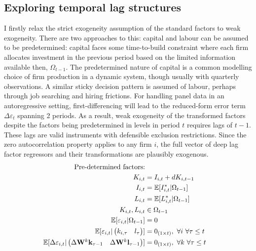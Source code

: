 \subsection{Exploring temporal lag structures}
\label{ss:dyn-ar}

I firstly relax the strict exogeneity assumption of the standard factors to weak exogeneity.
There are two approaches to this:
capital and labour can be assumed to be predetermined:
capital faces some time-to-build constraint
where each firm allocates investment in the previous period
based on the limited information available then, $\Omega_{t-1}$.
The predetermined nature of capital is a common modelling choice of
firm production in a dynamic system, though usually with quarterly observations.
A similar sticky decision pattern is assumed of labour,
perhaps through job searching and hiring frictions.
For handling panel data in an autoregressive setting,
first-differencing will lead to the reduced-form error term $\Delta\varepsilon_t$
spanning 2 periods.
As a result, weak exogeneity of the transformed factors
despite the factors being predetermined in levels in period $t$
requires lags of $t-1$.
These lags are valid instruments with defensible exclusion restrictions.
Since the zero autocorrelation property applies to any firm $i$,
the full vector of deep lag factor regressors and their transformations
are plausibly exogenous.
\begin{align}
    \notag
    \text{Pre-determined factors:}
    \\ \notag
    K_{i,t} &= I_{i,t} + dK_{i,t-1}
    \\ \notag
    I_{i,t} &= \mathbb E[I_{i,t}^*|\Omega_{t-1}]
    \\ \notag
    L_{i,t} &= \mathbb E[L_{i,t}^*|\Omega_{t-1}]
    \\ \notag
    K_{i,t}, L_{i,t} &\in \Omega_{t-1}
    \\ \notag
    \mathbb E[\varepsilon_{i,t}|\Omega_{t-1}] &= 0 
    \\
    \label{eq:dyn-weak-exog-pred}
    \mathbb E[
        \varepsilon_{i,t}
        \vert
        \begin{pmatrix}
            k_{i,\tau} & l_{\tau}
        \end{pmatrix}
    ] &= 0_{(1\times t)}
    ,\ \forall i\ \forall \tau\leq t
    \\
    \label{eq:dyn-weak-exog-pred-diff}
    \mathbb E[
        \Delta\varepsilon_{i,t}
        \vert
        \begin{pmatrix}
            \Delta \mathbf W^k\mathbf k_{\tau-1} & \Delta \mathbf W^k \mathbf l_{\tau-1}
        \end{pmatrix}
    ] &= 0_{(1\times t)}
    ,\ \forall k\ \forall \tau\leq t
\end{align}

